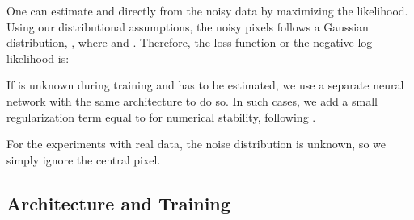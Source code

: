 \documentclass[final]{cvpr}
\begin{document}
One can estimate  and  directly from the noisy data by maximizing the likelihood. Using our distributional assumptions, the noisy pixels  follows a Gaussian distribution, , where  and . Therefore, the loss function or the negative log likelihood is:

If  is unknown during training and has to be estimated, we use a separate neural network with the same architecture to do so. In such cases, we add a small regularization term equal to  for numerical stability, following \cite{blindspotnet}. 

For the experiments with real data, the noise distribution is unknown, so we simply ignore the central pixel. 


\subsection{Architecture and Training}
\label{sec:arch}
\end{document}
